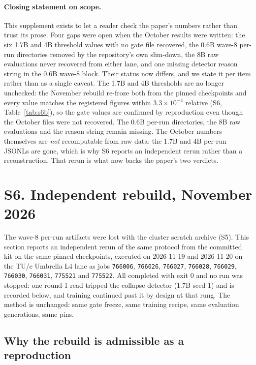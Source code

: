 \documentclass[11pt,a4paper]{article}
\begin{document}
\paragraph{Closing statement on scope.} This supplement exists to let a reader check the paper's
numbers rather than trust its prose. Four gaps were open when the October results were written: the
six 1.7B and 4B threshold values with no gate file recovered, the 0.6B wave-8 per-run directories
removed by the repository's own slim-down, the 8B raw evaluations never recovered from either lane,
and one missing detector reason string in the 0.6B wave-8 block. Their status now differs, and we
state it per item rather than as a single caveat. The 1.7B and 4B thresholds are no longer
unchecked: the November rebuild re-froze both from the pinned checkpoints and every value matches
the registered figures within $3.3\times10^{-4}$ relative (S6, Table~\ref{tab:s6b}), so the gate
values are confirmed by reproduction even though the October files were not recovered. The 0.6B
per-run directories, the 8B raw evaluations and the reason string remain missing. The October
numbers themselves are \emph{not} recomputable from raw data: the 1.7B and 4B per-run JSONLs are
gone, which is why S6 reports an independent rerun rather than a reconstruction. That rerun is what
now backs the paper's two verdicts.

\section{S6. Independent rebuild, November 2026}\label{sec:s6}

The wave-8 per-run artifacts were lost with the cluster scratch archive (S5). This section reports an
independent rerun of the same protocol from the committed kit on the same pinned checkpoints, executed
on 2026-11-19 and 2026-11-20 on the TU/e Umbrella L4 lane as jobs \texttt{766006}, \texttt{766026},
\texttt{766027}, \texttt{766028}, \texttt{766029}, \texttt{766030}, \texttt{766031}, \texttt{775521}
and \texttt{775522}. All completed with exit 0 and no run was stopped: one round-1 read tripped the
collapse detector (1.7B seed 1) and is recorded below, and training continued past it by design at
that rung. The method is unchanged: same gate freeze, same training recipe, same evaluation
generations, same pins.

\subsection*{Why the rebuild is admissible as a reproduction}
\end{document}
